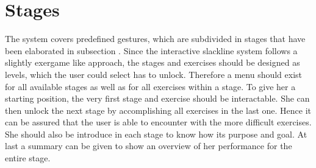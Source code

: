 \section{Stages}\label{4_3_stages}
The system covers predefined gestures, which are subdivided in stages that have been elaborated in subsection \textit{}. Since the interactive slackline system follows a slightly exergame like approach, the stages and exercises should be designed as levels, which the user could select has to unlock. Therefore a menu should exist for all available stages as well as for all exercises within a stage. To give her a starting position, the very first stage and exercise should be interactable. 
She can then unlock the next stage by accomplishing all exercises in the last one. Hence it can be assured that the user is able to encounter with the more difficult exercises. She should also be introduce in each stage to know how its purpose and goal. At last a summary can be given to show an overview of her performance for the entire stage.

